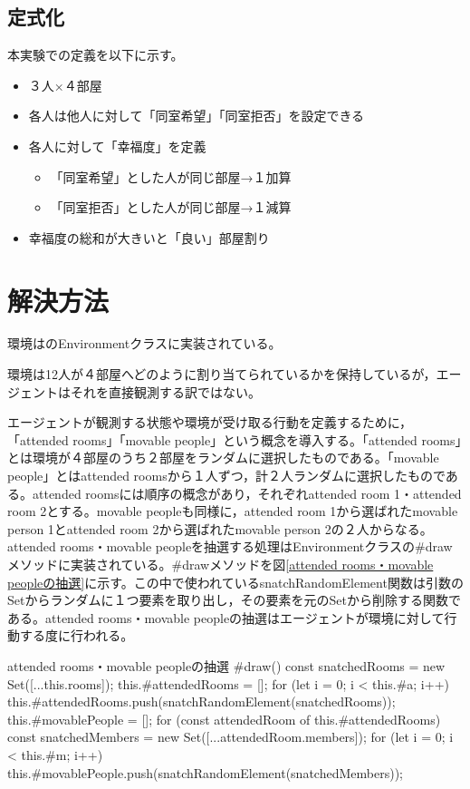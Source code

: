 \documentclass[titlepage]{ltjsreport}
\begin{document}
\section{定式化}
本実験での定義を以下に示す。
\begin{itemize}
\item ３人×４部屋
\item 各人は他人に対して「同室希望」「同室拒否」を設定できる
\item 各人に対して「幸福度」を定義
\begin{itemize}
\item 「同室希望」とした人が同じ部屋→１加算
\item 「同室拒否」とした人が同じ部屋→１減算
\end{itemize}
\item 幸福度の総和が大きいと「良い」部屋割り
\end{itemize}
\chapter{解決方法}
\label{解決方法}
環境は\cite{環境}のEnvironmentクラスに実装されている。

環境は12人が４部屋へどのように割り当てられているかを保持しているが，エージェントはそれを直接観測する訳ではない。

エージェントが観測する状態や環境が受け取る行動を定義するために，「attended rooms」「movable people」という概念を導入する。「attended rooms」とは環境が４部屋のうち２部屋をランダムに選択したものである。「movable people」とはattended roomsから１人ずつ，計２人ランダムに選択したものである。attended roomsには順序の概念があり，それぞれattended room 1・attended room 2とする。movable peopleも同様に，attended room 1から選ばれたmovable person 1とattended room 2から選ばれたmovable person 2の２人からなる。attended rooms・movable peopleを抽選する処理はEnvironmentクラスの\#drawメソッドに実装されている。\#drawメソッドを図\ref{attended rooms・movable peopleの抽選}に示す。この中で使われているsnatchRandomElement関数は引数のSetからランダムに１つ要素を取り出し，その要素を元のSetから削除する関数である。attended rooms・movable peopleの抽選はエージェントが環境に対して行動する度に行われる。
\begin{textbox}{attended rooms・movable peopleの抽選}
#draw() {
	const snatchedRooms = new Set([...this.rooms]);
	this.#attendedRooms = [];
	for (let i = 0; i < this.#a; i++) {
		this.#attendedRooms.push(snatchRandomElement(snatchedRooms));
	}
	this.#movablePeople = [];
	for (const attendedRoom of this.#attendedRooms) {
		const snatchedMembers = new Set([...attendedRoom.members]);
		for (let i = 0; i < this.#m; i++) {
			this.#movablePeople.push(snatchRandomElement(snatchedMembers));
		}
	}
}
\end{textbox}
\end{document}
